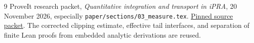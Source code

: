 \begin{thebibliography}{9}
ProveIt research packet,
\emph{Quantitative integration and transport in iPRA},
20 November 2026, especially \texttt{paper/sections/03\_measure.tex}.
\href{https://github.com/VladimirReshetnikov/ProveIt/tree/83421593771f877bc1ae98f4229eb35507bff05b/Logic/PrimitiveRecursiveArithmetic/docs/proofs/foundations/ipra_measure_transport_2026-11-20}{Pinned source packet}.
The corrected clipping estimate, effective tail interfaces, and separation
of finite Lean proofs from embedded analytic derivations are reused.

\end{thebibliography}
